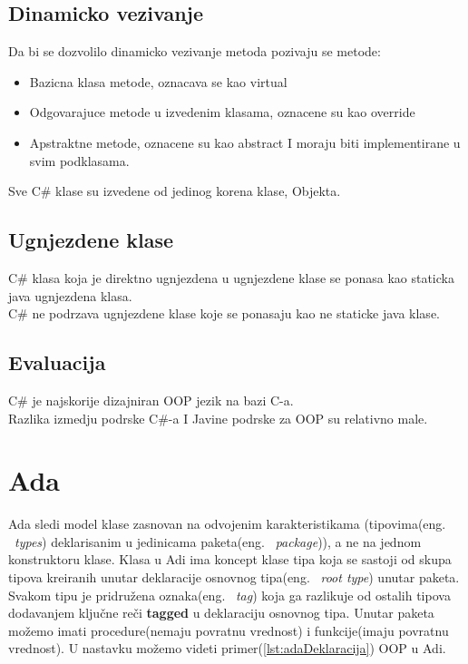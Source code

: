 \documentclass[a4paper]{article}
\begin{document}
\subsection{Dinamicko vezivanje}
\label{subsec:csharpDinamickoVezivanje}

Da bi se dozvolilo dinamicko vezivanje metoda pozivaju se metode:\\

\begin{itemize}
  \item Bazicna klasa metode, oznacava se kao virtual
  \item Odgovarajuce metode u izvedenim klasama, oznacene su kao override
  \item Apstraktne metode, oznacene su kao abstract I moraju biti implementirane u svim podklasama.
\end{itemize}

Sve C\# klase su izvedene od jedinog korena klase, Objekta.\\

\subsection{Ugnjezdene klase}
\label{subsec:csharpUgnjezdeneKlase}

C\# klasa koja je direktno ugnjezdena u ugnjezdene klase se ponasa kao staticka java ugnjezdena klasa.\\
C\# ne podrzava ugnjezdene klase koje se ponasaju kao ne staticke java klase.\\

\subsection{Evaluacija}
\label{subsec:csharpEvaluacija}

C\# je najskorije dizajniran OOP jezik na bazi C-a.\\
Razlika izmedju podrske C\#-a I Javine podrske za OOP su relativno male.\\

\section{Ada}
\label{sec:ada}

Ada sledi model klase zasnovan na odvojenim karakteristikama (tipovima(eng. ~{\em types}) deklarisanim u jedinicama paketa(eng. ~{\em package})), a ne na jednom konstruktoru klase\cite{oopAda}. Klasa u Adi ima koncept klase tipa koja se sastoji od skupa tipova kreiranih unutar deklaracije osnovnog tipa(eng. ~{\em root type}) unutar paketa. Svakom tipu je pridružena oznaka(eng. ~{\em tag}) koja ga razlikuje od ostalih tipova dodavanjem ključne reči \textbf{tagged} u deklaraciju osnovnog tipa. Unutar paketa možemo imati procedure(nemaju povratnu vrednost) i funkcije(imaju povratnu vrednost). U nastavku možemo videti primer(\ref{lst:adaDeklaracija}) OOP u Adi.
\end{document}
